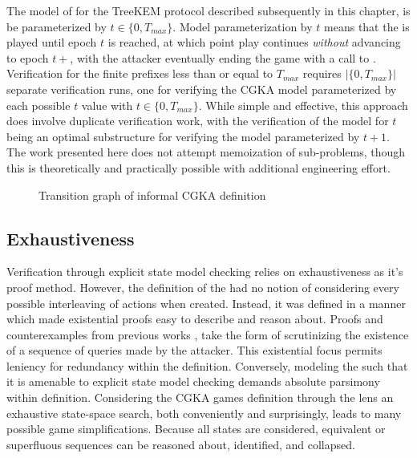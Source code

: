 The model of \CGKAsec for the TreeKEM protocol described subsequently in this chapter, is be parameterized by $t \in \{ 0, T_{max} \}$.
Model parameterization by $t$ means that the \CGKAsec is played until epoch $t$ is reached, at which point play continues \emph{without} advancing to epoch $t+$, with the attacker eventually ending the game with a call to .
Verification for the finite \CGKAsec prefixes less than or equal to \(T_{max}\) requires $|\{ 0, T_{max} \}|$ separate verification runs, one for verifying the CGKA model parameterized by each possible $t$ value with $t \in \{ 0, T_{max} \}$.
While simple and effective, this approach does involve duplicate verification work, with the verification of the model for $t$ being an optimal substructure for verifying the model parameterized by $t+1$.
The work presented here does not attempt memoization of sub-problems, though this is theoretically and practically possible with additional engineering effort.

\begin{figure}
  \centering
  \caption{\label{fig:CGKA-informal}Transition graph of informal CGKA definition}
\end{figure}



\hypertarget{exhaustiveness}{%
\subsection{Exhaustiveness}\label{exhaustiveness}}

Verification through explicit state model checking relies on exhaustiveness as it's proof method.
However, the definition of the \CGKAsec had no notion of considering every possible interleaving of actions when created.
Instead, it was defined in a manner which made existential proofs easy to describe and reason about.
Proofs and counterexamples from previous works \autocite{alwen2019double}, \autocite{alwen2020security} take the form of scrutinizing the existence of a sequence of queries made by the attacker.
This existential focus permits leniency for redundancy within the \CGKAsec definition.
Conversely, modeling the \CGKAsec such that it is amenable to explicit state model checking demands absolute parsimony within definition.
Considering the CGKA games definition through the lens an exhaustive state-space search, both conveniently and surprisingly, leads to many possible game simplifications.
Because all states are considered, equivalent or superfluous sequences can be reasoned about, identified, and collapsed.

